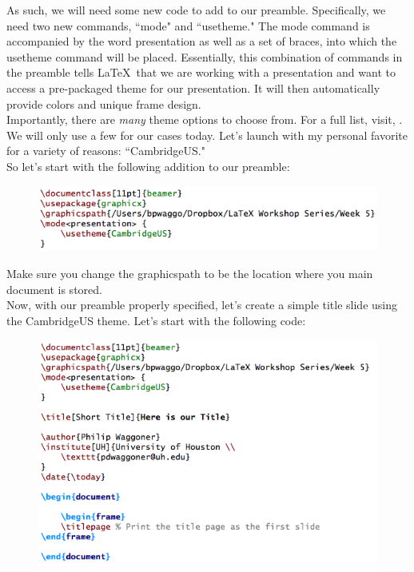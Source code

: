 \documentclass[11pt]{article}
\begin{document}
As such, we will need some new code to add to our preamble. Specifically, we need two new commands, ``mode" and ``usetheme." The mode command is accompanied by the word presentation as well as a set of braces, into which the usetheme command will be placed. Essentially, this combination of commands in the preamble tells \LaTeX\ that we are working with a presentation and want to access a pre-packaged theme for our presentation. It will then automatically provide colors and unique frame design. \\

Importantly, there are \textit{many} theme options to choose from. For a full list, visit, . We will only use a few for our cases today. Let's launch with my personal favorite for a variety of reasons: ``CambridgeUS." \\

So let's start with the following addition to our preamble:

\begin{figure}[!h]
	\includegraphics[scale=.5]{CODE1}
	\centering
\end{figure}

Make sure you change the graphicspath to be the location where you main document is stored. \\

Now, with our preamble properly specified, let's create a simple title slide using the CambridgeUS theme. Let's start with the following code:

\begin{figure}[!h]
	\includegraphics[scale=.5]{CODE2}
	\centering
\end{figure}
\end{document}
